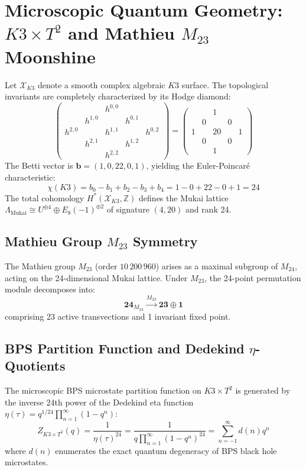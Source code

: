 \documentclass[10pt,twocolumn,letterpaper]{article}
\begin{document}
\section{Microscopic Quantum Geometry: $K3 \times T^2$ and Mathieu $M_{23}$ Moonshine}
Let $\mathcal{X}_{K3}$ denote a smooth complex algebraic $K3$ surface. The topological invariants are completely characterized by its Hodge diamond:
\begin{equation}
\begin{pmatrix}
& & h^{0,0} & & \\
& h^{1,0} & & h^{0,1} & \\
h^{2,0} & & h^{1,1} & & h^{0,2} \\
& h^{2,1} & & h^{1,2} & \\
& & h^{2,2} & &
\end{pmatrix}
=
\begin{pmatrix}
& & 1 & & \\
& 0 & & 0 & \\
1 & & 20 & & 1 \\
& 0 & & 0 & \\
& & 1 & &
\end{pmatrix}
\end{equation}
The Betti vector is $\mathbf{b} = (1, 0, 22, 0, 1)$, yielding the Euler-Poincar\'e characteristic:
\begin{equation}
\chi(K3) = b_0 - b_1 + b_2 - b_3 + b_4 = 1 - 0 + 22 - 0 + 1 = 24
\end{equation}
The total cohomology $H^*(\mathcal{X}_{K3}, \mathbb{Z})$ defines the Mukai lattice $\Lambda_{\text{Mukai}} \cong U^{\oplus 4} \oplus E_8(-1)^{\oplus 2}$ of signature $(4, 20)$ and rank 24.

\subsection{Mathieu Group $M_{23}$ Symmetry}
The Mathieu group $M_{23}$ (order $10\,200\,960$) arises as a maximal subgroup of $M_{24}$, acting on the 24-dimensional Mukai lattice. Under $M_{23}$, the 24-point permutation module decomposes into:
\begin{equation}
\mathbf{24}_{M_{24}} \xrightarrow{M_{23}} \mathbf{23} \oplus \mathbf{1}
\end{equation}
comprising 23 active transvections and 1 invariant fixed point.

\subsection{BPS Partition Function and Dedekind $\eta$-Quotients}
The microscopic BPS microstate partition function on $K3 \times T^2$ is generated by the inverse 24th power of the Dedekind eta function $\eta(\tau) = q^{1/24} \prod_{n=1}^\infty (1 - q^n)$:
\begin{equation}
Z_{K3 \times T^2}(q) = \frac{1}{\eta(\tau)^{24}} = \frac{1}{q \prod_{n=1}^\infty (1 - q^n)^{24}} = \sum_{n=-1}^\infty d(n) q^n
\end{equation}
where $d(n)$ enumerates the exact quantum degeneracy of BPS black hole microstates.
\end{document}
